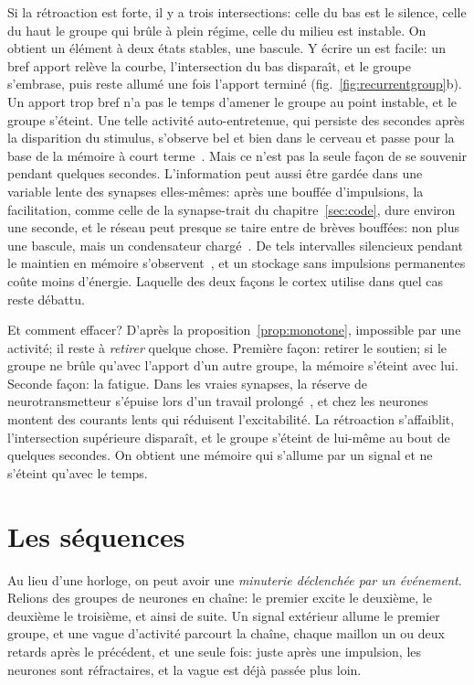 Si la rétroaction est forte, il y a trois intersections: celle du bas est le silence, celle du haut le groupe qui brûle à plein régime, celle du milieu est instable. On obtient un élément à deux états stables, une bascule. Y écrire un \fg{} est facile: un bref apport relève la courbe, l'intersection du bas disparaît, et le groupe s'embrase, puis reste allumé une fois l'apport terminé (fig.~\ref{fig:recurrentgroup}b). Un apport trop bref n'a pas le temps d'amener le groupe au point instable, et le groupe s'éteint. Une telle activité auto-entretenue, qui persiste des secondes après la disparition du stimulus, s'observe bel et bien dans le cerveau et passe pour la base de la mémoire à court terme~\cite{Wang2001}. Mais ce n'est pas la seule façon de se souvenir pendant quelques secondes. L'information peut aussi être gardée dans une variable lente des synapses elles-mêmes: après une bouffée d'impulsions, la facilitation, comme celle de la synapse-\og trait\fg{} du chapitre~\ref{sec:code}, dure environ une seconde, et le réseau peut presque se taire entre de brèves bouffées: non plus une bascule, mais un condensateur chargé~\cite{Mongillo2008}. De tels intervalles \og silencieux\fg{} pendant le maintien en mémoire s'observent~\cite{Stokes2015}, et un stockage sans impulsions permanentes coûte moins d'énergie. Laquelle des deux façons le cortex utilise dans quel cas reste débattu.

Et comment effacer? D'après la proposition~\ref{prop:monotone}, impossible par une activité; il reste à \emph{retirer} quelque chose. Première façon: retirer le soutien; si le groupe ne brûle qu'avec l'apport d'un autre groupe, la mémoire s'éteint avec lui. Seconde façon: la fatigue. Dans les vraies synapses, la réserve de neurotransmetteur s'épuise lors d'un travail prolongé~\cite{Tsodyks1997}, et chez les neurones montent des courants lents qui réduisent l'excitabilité. La rétroaction s'affaiblit, l'intersection supérieure disparaît, et le groupe s'éteint de lui-même au bout de quelques secondes. On obtient une mémoire qui s'allume par un signal et ne s'éteint qu'avec le temps.

\section{Les séquences}

Au lieu d'une horloge, on peut avoir une \emph{minuterie déclenchée par un événement}. Relions des groupes de neurones  en chaîne: le premier excite le deuxième, le deuxième le troisième, et ainsi de suite. Un signal extérieur allume le premier groupe, et une vague d'activité parcourt la chaîne, chaque maillon un ou deux retards après le précédent, et une seule fois: juste après une impulsion, les neurones sont réfractaires, et la vague est déjà passée plus loin.

